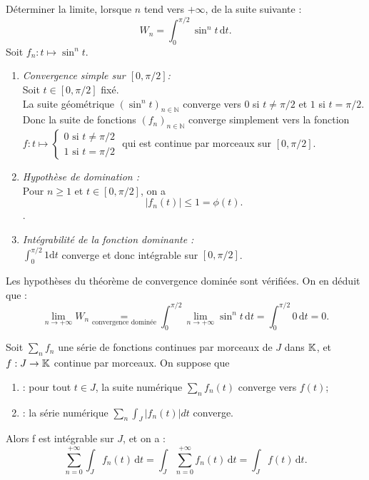 \documentclass{book}
\begin{document}
\begin{Exemple}[Wallis]
Déterminer la limite, lorsque $n$ tend vers $+\infty$, de la  suite suivante :
$$W_n=\int_0^{\pi/2}\sin^n t \, \mathrm dt.$$
Soit $f_n:t\mapsto \sin^n t$.
\begin{enumerate}
\item \textit{Convergence simple sur $[0,\pi/2]$:}\\ 
Soit $t\in[0,\pi/2]$ fixé.\\
La suite géométrique $(\sin^n t)_{n\in\mathbb{N}}$ converge vers 0 si $t\neq \pi/2$ et $1$ si $t= \pi/2$. Donc la suite de fonctions $(f_n)_{n\in\mathbb{N}}$ converge simplement vers la fonction $f:t\mapsto \begin{cases} 0\text{ si } t\neq \pi/2\\1\text{ si }t=\pi/2 \end{cases}  $ qui est continue par morceaux sur $[0,\pi/2]$.
\item \textit{Hypothèse de domination :}\\ 
Pour $n\geq 1$ et $t\in [0,\pi/2] $, on a
$$\left|f_n(t)\right| \leq 1=\phi(t).$$.
\item \textit{Intégrabilité de la fonction dominante :}\\
$\int_0^{\pi/2}1 \mathrm dt $ converge et donc intégrable sur $[0,\pi/2]$.
\end{enumerate}
Les hypothèses du théorème de convergence dominée sont vérifiées. On en déduit que :
$$\lim_{n\to +\infty}W_n\underset{\text{convergence dominée}}{=}\int_0^{\pi/2}\lim_{n\to +\infty} \sin^n t\, \mathrm dt= \int_0^{\pi/2} 0\, \mathrm dt=0.$$
\end{Exemple}



\begin{Theoreme} Soit $\sum_n f_n $ une série de fonctions continues par morceaux de $J$ dans $\mathbb{K}$, et $f:J\to\mathbb{K}$ continue par morceaux. On suppose que
\begin{enumerate}
\item {}: pour tout $t\in J$, la suite numérique $\sum_n f_n(t)$ converge vers $f(t)$;
\item {} : la série numérique $\sum_n \int_J|f_n(t)|dt$ converge.
\end{enumerate} 
Alors f est intégrable sur $J$, et on a :
$$\sum_{n=0}^{+\infty} \int_J f_n(t)\,\mathrm dt = \int_J \sum_{n=0}^{+\infty} f_n(t)\,\mathrm dt= \int_J f(t)\,\mathrm dt.$$
\end{Theoreme}
\end{document}
